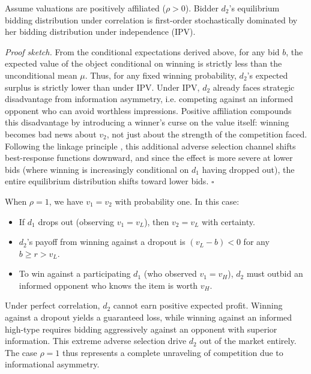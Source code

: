 \begin{prop}\label{prop:correlation-direction}
Assume valuations are positively affiliated ($\rho > 0$). Bidder $d_2$'s equilibrium bidding distribution under correlation is first-order stochastically dominated by her bidding distribution under independence (IPV).
\end{prop}

\noindent \emph{Proof sketch.} From the conditional expectations derived above, for any bid $b$, the expected value of the object conditional on winning is strictly less than the unconditional mean $\mu$. Thus, for any fixed winning probability, $d_2$'s expected surplus is strictly lower than under IPV. Under IPV, $d_2$ already faces strategic disadvantage from information asymmetry, i.e. competing against an informed opponent who can avoid worthless impressions. Positive affiliation compounds this disadvantage by introducing a winner's curse on the value itself: winning becomes bad news about $v_2$, not just about the strength of the competition faced. Following the linkage principle \parencite{milgromTheoryAuctionsCompetitive1982}, this additional adverse selection channel shifts best-response functions downward, and since the effect is more severe at lower bids (where winning is increasingly conditional on $d_1$ having dropped out), the entire equilibrium distribution shifts toward lower bids. \hfill $\square$

\noindent When $\rho = 1$, we have $v_1 = v_2$ with probability one. In this case:
\begin{itemize}
    \item If $d_1$ drops out (observing $v_1 = v_L$), then $v_2 = v_L$ with certainty.
    \item $d_2$'s payoff from winning against a dropout is $(v_L - b) < 0$ for any $b \geq r > v_L$.
    \item To win against a participating $d_1$ (who observed $v_1 = v_H$), $d_2$ must outbid an informed opponent who knows the item is worth $v_H$.
\end{itemize}

\noindent Under perfect correlation, $d_2$ cannot earn positive expected profit. Winning against a dropout yields a guaranteed loss, while winning against an informed high-type requires bidding aggressively against an opponent with superior information. This extreme adverse selection drive $d_2$ out of the market entirely. The case $\rho = 1$ thus represents a complete unraveling of competition due to informational asymmetry.

